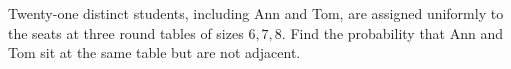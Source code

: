 Twenty-one distinct students, including Ann and Tom, are assigned uniformly to the seats at three round tables of sizes $6,7,8$. Find the probability that Ann and Tom sit at the same table but are not adjacent.
